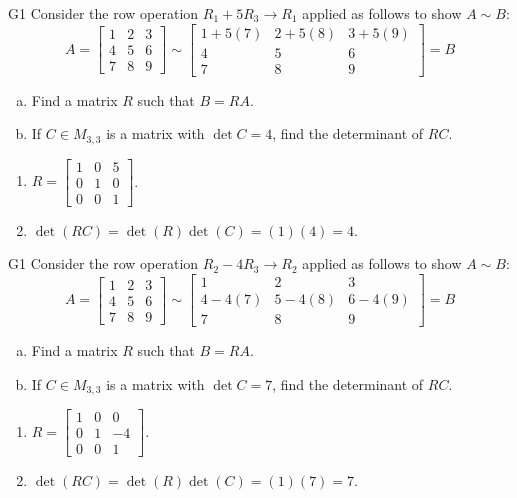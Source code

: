 \begin{problem}{G1}
Consider the row operation \(R_1+5R_3\to R_1\) applied as follows to show
\(A\sim B\):
\[
A=\begin{bmatrix}1&2&3\\4&5&6\\7&8&9\end{bmatrix}
  \sim
\begin{bmatrix}1+5(7)&2+5(8)&3+5(9)\\4&5&6\\7&8&9\end{bmatrix}=B
\]
\begin{enumerate}[(a)]
\item Find a matrix \(R\) such that \(B=RA\).
\item If \(C \in M_{3,3}\) is a matrix with \(\det C = 4\), find the determinant of \(RC\).
\end{enumerate}
\end{problem}
\begin{solution}
\begin{enumerate}
\item \(R= \begin{bmatrix} 1 & 0 & 5 \\ 0 & 1 & 0 \\ 0 & 0 & 1 \end{bmatrix}\).
\item \(\det(RC)= \det(R)\det(C)=(1)(4)=4\).
\end{enumerate}
\end{solution}

\begin{problem}{G1}
Consider the row operation \(R_2-4R_3\to R_2\) applied as follows to show
\(A\sim B\):
\[
A=\begin{bmatrix}1&2&3\\4&5&6\\7&8&9\end{bmatrix}
  \sim
\begin{bmatrix}1&2&3\\4-4(7)&5-4(8)&6-4(9)\\7&8&9\end{bmatrix}=B
\]
\begin{enumerate}[(a)]
\item Find a matrix \(R\) such that \(B=RA\).
\item If \(C \in M_{3,3}\) is a matrix with \(\det C = 7\), find the determinant of \(RC\).
\end{enumerate}
\end{problem}
\begin{solution}
\begin{enumerate}
\item \(R= \begin{bmatrix} 1 & 0 & 0 \\ 0 & 1 & -4 \\ 0 & 0 & 1 \end{bmatrix}\).
\item \(\det(RC)= \det(R)\det(C)=(1)(7)=7\).
\end{enumerate}
\end{solution}

